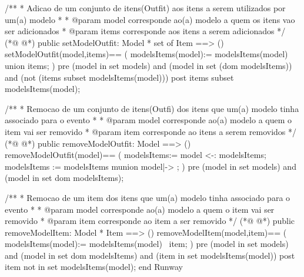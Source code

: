 \begin{vdmpp}[breaklines=true]
 /**
 * Adicao de um conjunto de itens(Outfit) aos itens a serem utilizados por um(a) modelo
 * 
 * @param model corresponde ao(a) modelo a quem os itens vao ser adicionados
 * @param items corresponde aos itens a serem adicionados
 */
(*@
\label{setModelOutfit:250}
@*)
 public setModelOutfit: Model * set of Item ==> ()
 setModelOutfit(model,items)==
 (
   modelsItems(model):= modelsItems(model) union items;
 )
 pre (model in set models) and
   (model in set (dom modelsItems)) and
   (not (items  subset modelsItems(model)))
 post items subset modelsItems(model);
 
 /**
 * Remocao de um conjunto de itens(Outfi) dos itens que um(a) modelo tinha associado para o evento
 * 
 * @param model corresponde ao(a) modelo a quem o item vai ser removido
 * @param item corresponde ao itens a serem removidos
 */
(*@
\label{removeModelOutfit:266}
@*)
 public removeModelOutfit: Model ==> ()
 removeModelOutfit(model)==
 (
  modelsItems:= {model} <-: modelsItems;
  modelsItems := modelsItems munion {model|-> {}};
 )
 pre (model in set models) and
   (model in set dom modelsItems);
 
 /**
 * Remocao de um item dos itens que um(a) modelo tinha associado para o evento
 * 
 * @param model corresponde ao(a) modelo a quem o item vai ser removido
 * @param item corresponde ao item a ser removido
 */ 
(*@
\label{removeModelItem:281}
@*)
 public removeModelItem: Model * Item ==> ()
 removeModelItem(model,item)==
 (
  modelsItems(model):= modelsItems(model) \ {item};
 )
 pre (model in set models) and
   (model in set dom modelsItems) and
   (item in set modelsItems(model))
 post item not in set modelsItems(model);
end Runway
\end{vdmpp}
\bigskip
